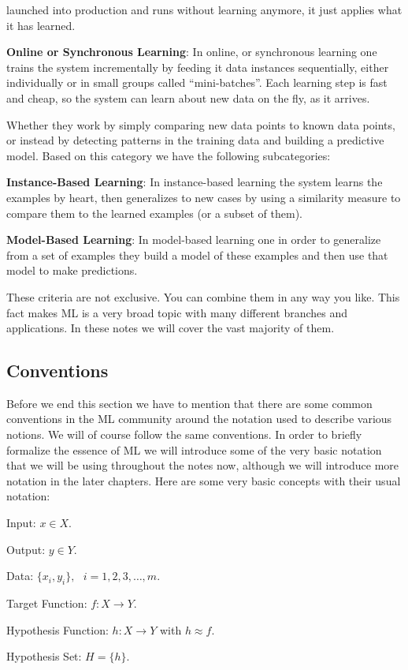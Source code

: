 launched into production and runs without learning anymore, it just applies what it has learned.
\item \textbf{Online or Synchronous Learning}: In online, or synchronous learning one trains the system incrementally by
feeding it data instances sequentially, either individually or in small groups called ``mini-batches''. Each learning
step is fast and cheap, so the system can learn about new data on the fly, as it arrives.
\eit
\item Whether they work by simply comparing new data points to known data
points, or instead by detecting patterns in the training data and building a predictive model. Based on this
category we have the following subcategories:
\bit
\item \textbf{Instance-Based Learning}: In instance-based learning the system learns the examples by heart, then
generalizes to new cases by using a similarity measure to compare them to the learned examples (or a subset of them).
\item \textbf{Model-Based Learning}: In model-based learning one in order to generalize from a set of examples they
build a model of these examples and then use that model to make predictions.
\eit
\een

These criteria are not exclusive. You can combine them in any way you like. This fact makes ML is a very broad topic
with many different branches and applications. In these notes we will cover the vast majority of them.

\subsection{Conventions}

Before we end this section we have to mention that there are some common conventions in the ML
community around the notation used to describe various notions. We will of course follow the same conventions. In
order to briefly formalize the essence of ML we will introduce some of the very basic notation that we
will be using throughout the notes now, although we will introduce more notation in the later chapters. Here are some
very basic concepts with their usual notation:
\bit
\item Input: $x \in X$.
\item Output: $y \in Y$.
\item Data: $\{ x_{i}, y_{i} \}, \:\:\: i=1,2,3,\ldots, m$.
\item Target Function: $f: X \to Y$.
\item Hypothesis Function: $h: X \to Y$ with $ h \approx f$.
\item Hypothesis Set: $H = \{h\}$.
\eit

